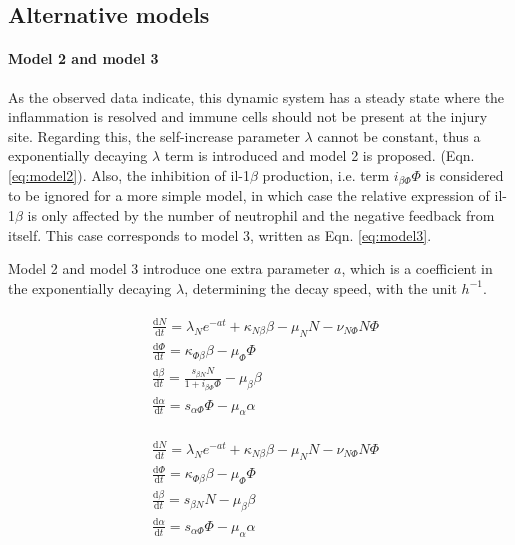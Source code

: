 \documentclass[12pt,a4paper]{report}
\begin{document}
\subsection{Alternative models}

\paragraph{Model 2 and model 3}

As the observed data indicate, this dynamic system has a steady state where the  inflammation is resolved and immune cells should not be present at the injury site. Regarding this, the self-increase parameter $\lambda$ cannot be constant, thus a exponentially decaying $\lambda$ term is introduced and model 2 is proposed. (Eqn. \ref{eq:model2}). Also, the inhibition of il-1$\beta$ production, i.e. term $i_{\beta\Phi}\Phi$ is considered to be ignored for a more simple model, in which case the relative expression of il-1$\beta$ is only affected by the number of neutrophil and the negative feedback from itself. This case corresponds to model 3, written as Eqn. \ref{eq:model3}.

Model 2 and model 3 introduce one extra parameter $a$, which is a coefficient in the exponentially decaying $\lambda$, determining the decay speed, with the unit $h^{-1}$.

\begin{align}
    \label{eq:model2}
    \begin{split}
        &\frac{\mathrm{d} N}{\mathrm{d} t}=\lambda_Ne^{-at}+\kappa_{N\beta}\beta-\mu_NN-\nu_{N\Phi}N\Phi\\
        &\frac{\mathrm{d} \Phi}{\mathrm{d} t}=\kappa_{\Phi\beta}\beta-\mu_\Phi\Phi\\
        &\frac{\mathrm{d} \beta}{\mathrm{d} t}=\frac{s_{\beta N}N}{1+i_{\beta\Phi}\Phi}-\mu_\beta\beta\\
        &\frac{\mathrm{d} \alpha}{\mathrm{d} t}=s_{\alpha\Phi}\Phi-\mu_\alpha\alpha
    \end{split}
\end{align}

\begin{align}
    \label{eq:model3}
    \begin{split}
        &\frac{\mathrm{d} N}{\mathrm{d} t}=\lambda_Ne^{-at}+\kappa_{N\beta}\beta-\mu_NN-\nu_{N\Phi}N\Phi\\
        &\frac{\mathrm{d} \Phi}{\mathrm{d} t}=\kappa_{\Phi\beta}\beta-\mu_\Phi\Phi\\
        &\frac{\mathrm{d} \beta}{\mathrm{d} t}=s_{\beta N}N-\mu_\beta\beta\\
        &\frac{\mathrm{d} \alpha}{\mathrm{d} t}=s_{\alpha\Phi}\Phi-\mu_\alpha\alpha
    \end{split}
\end{align}
\end{document}
